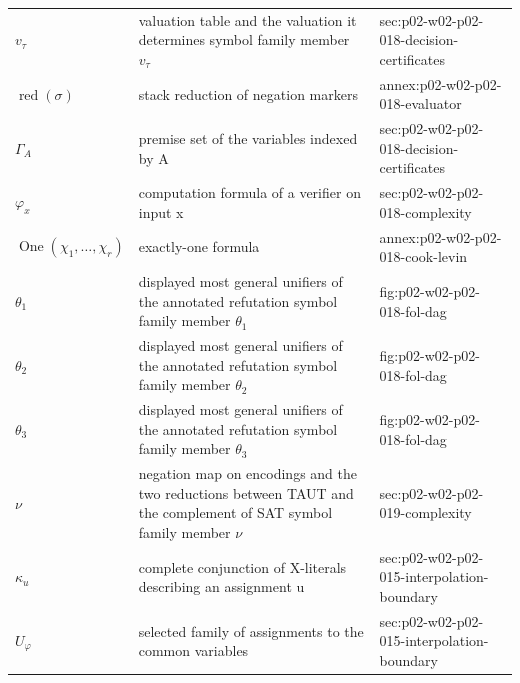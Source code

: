 \begin{longtable}{@{}p{}p{}p{}@{}}
\(v_\tau\) & valuation table and the valuation it determines symbol family member \(v_\tau\) & sec:\allowbreak{}p02-\allowbreak{}w02-\allowbreak{}p02-\allowbreak{}018-\allowbreak{}decision-\allowbreak{}certificates \\
\(\operatorname{red}(\sigma)\) & stack reduction of negation markers & annex:\allowbreak{}p02-\allowbreak{}w02-\allowbreak{}p02-\allowbreak{}018-\allowbreak{}evaluator \\
\(\Gamma_A\) & premise set of the variables indexed by A & sec:\allowbreak{}p02-\allowbreak{}w02-\allowbreak{}p02-\allowbreak{}018-\allowbreak{}decision-\allowbreak{}certificates \\
\(\varphi_x\) & computation formula of a verifier on input x & sec:\allowbreak{}p02-\allowbreak{}w02-\allowbreak{}p02-\allowbreak{}018-\allowbreak{}complexity \\
\(\operatorname{One}(\chi_1,\allowbreak \ldots,\allowbreak \chi_r)\) & exactly-one formula & annex:\allowbreak{}p02-\allowbreak{}w02-\allowbreak{}p02-\allowbreak{}018-\allowbreak{}cook-\allowbreak{}levin \\
\(\theta_1\) & displayed most general unifiers of the annotated refutation symbol family member \(\theta_1\) & fig:\allowbreak{}p02-\allowbreak{}w02-\allowbreak{}p02-\allowbreak{}018-\allowbreak{}fol-\allowbreak{}dag \\
\(\theta_2\) & displayed most general unifiers of the annotated refutation symbol family member \(\theta_2\) & fig:\allowbreak{}p02-\allowbreak{}w02-\allowbreak{}p02-\allowbreak{}018-\allowbreak{}fol-\allowbreak{}dag \\
\(\theta_3\) & displayed most general unifiers of the annotated refutation symbol family member \(\theta_3\) & fig:\allowbreak{}p02-\allowbreak{}w02-\allowbreak{}p02-\allowbreak{}018-\allowbreak{}fol-\allowbreak{}dag \\
\(\nu\) & negation map on encodings and the two reductions between TAUT and the complement of SAT symbol family member \(\nu\) & sec:\allowbreak{}p02-\allowbreak{}w02-\allowbreak{}p02-\allowbreak{}019-\allowbreak{}complexity \\
\(\kappa_u\) & complete conjunction of X-literals describing an assignment u & sec:\allowbreak{}p02-\allowbreak{}w02-\allowbreak{}p02-\allowbreak{}015-\allowbreak{}interpolation-\allowbreak{}boundary \\
\(U_\varphi\) & selected family of assignments to the common variables & sec:\allowbreak{}p02-\allowbreak{}w02-\allowbreak{}p02-\allowbreak{}015-\allowbreak{}interpolation-\allowbreak{}boundary \\

\end{longtable}
